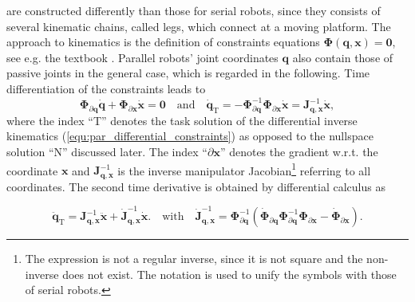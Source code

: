 \documentclass[runningheads]{llncs}
\newcommand{\bm}[1]{\boldsymbol{#1}}
\begin{document}
are constructed differently than those for serial robots, since they consists of several kinematic chains, called legs, which connect at a moving platform.
The approach to kinematics is the definition of constraints equations $\bm{\Phi}(\bm{q},\bm{x})=\bm{0}$, see e.g. the textbook \cite{Merlet2006}.
Parallel robots' joint coordinates $\bm{q}$ also contain those of passive joints in the general case, which is regarded in the following.
Time differentiation of the constraints leads to 
\begin{equation}
\bm{\Phi}_{\partial \bm{q}} \dot{\bm{q}} + \bm{\Phi}_{\partial \bm{x}} \dot{\bm{x}} = \bm{0}
\quad \mathrm{and} \quad
\dot{\bm{q}}_{\mathrm{T}}=
-\bm{\Phi}_{\partial \bm{q}}^{-1} \bm{\Phi}_{\partial \bm{x}}\dot{\bm{x}} = \bm{J}_{\bm{q},\bm{x}}^{-1}\dot{\bm{x}},
\label{equ:par_differential_constraints}
\end{equation}
where the index ``T'' denotes the task solution of the differential inverse kinematics (\ref{equ:par_differential_constraints}) as opposed to the nullspace solution ``N'' discussed later.
The index ``$\partial \bm{x}$'' denotes the gradient w.r.t. the coordinate $\bm{x}$ and $\bm{J}_{\bm{q},\bm{x}}^{-1}$ is the inverse manipulator Jacobian\footnote{The expression is not a regular inverse, since it is not square and the non-inverse does not exist. The notation is used to unify the symbols with those of serial robots. 
} referring to all coordinates.
The second time derivative is obtained by differential calculus as

\begin{equation}
\ddot{\bm{q}}_{\mathrm{T}}
=
\bm{J}_{\bm{q},\bm{x}}^{-1} \ddot{\bm{x}}+
\dot{\bm{J}}_{\bm{q},\bm{x}}^{-1} \dot{\bm{x}}.
\quad \mathrm{with} \quad
\dot{\bm{J}}_{\bm{q},\bm{x}}^{-1}
= 
\bm{\Phi}_{\partial \bm{q}}^{-1}
(\dot{\bm{\Phi}}_{\partial \bm{q}}
\bm{\Phi}_{\partial \bm{q}}^{-1}
\bm{\Phi}_{\partial \bm{x}}
- \dot{\bm{\Phi}}_{\partial \bm{x}}).
\label{equ:par_ik_acc_opspace2}
\end{equation}
\end{document}
